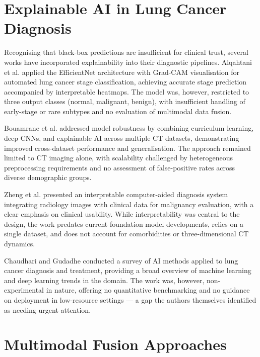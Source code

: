 {%
\section{Explainable AI in Lung Cancer Diagnosis}

Recognising that black-box predictions are insufficient for clinical trust, several
works have incorporated explainability into their diagnostic pipelines.
Alqahtani et al. \cite{alqahtani2025} applied the EfficientNet architecture with
Grad-CAM visualisation for automated lung cancer stage classification, achieving
accurate stage prediction accompanied by interpretable heatmaps. The model was,
however, restricted to three output classes (normal, malignant, benign), with
insufficient handling of early-stage or rare subtypes and no evaluation of multimodal
data fusion.

Bouamrane et al. \cite{bouamrane2024} addressed model robustness by combining curriculum
learning, deep CNNs, and explainable AI across multiple CT datasets, demonstrating
improved cross-dataset performance and generalisation. The approach remained limited to
CT imaging alone, with scalability challenged by heterogeneous preprocessing requirements
and no assessment of false-positive rates across diverse demographic groups.

Zheng et al. \cite{zheng2021} presented an interpretable computer-aided diagnosis system
integrating radiology images with clinical data for malignancy evaluation, with a clear
emphasis on clinical usability. While interpretability was central to the design, the
work predates current foundation model developments, relies on a single dataset, and does
not account for comorbidities or three-dimensional CT dynamics.

Chaudhari and Gudadhe \cite{chaudhari2025} conducted a survey of AI methods applied to
lung cancer diagnosis and treatment, providing a broad overview of machine learning and
deep learning trends in the domain. The work was, however, non-experimental in nature,
offering no quantitative benchmarking and no guidance on deployment in low-resource
settings — a gap the authors themselves identified as needing urgent attention.

\section{Multimodal Fusion Approaches}

}
